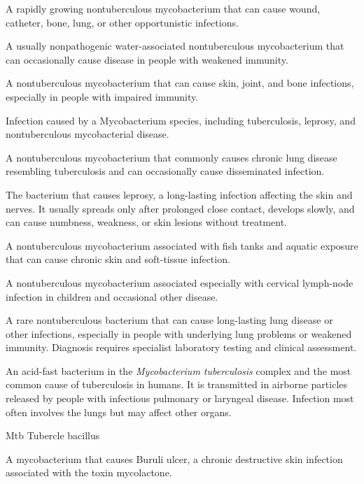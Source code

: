  A rapidly growing nontuberculous mycobacterium that can cause wound, catheter, bone, lung, or other opportunistic infections.

 A usually nonpathogenic water-associated nontuberculous mycobacterium that can occasionally cause disease in people with weakened immunity.

 A nontuberculous mycobacterium that can cause skin, joint, and bone infections, especially in people with impaired immunity.

 Infection caused by a Mycobacterium species, including tuberculosis, leprosy, and nontuberculous mycobacterial disease.

 A nontuberculous mycobacterium that commonly causes chronic lung disease resembling tuberculosis and can occasionally cause disseminated infection.

 The bacterium that causes leprosy, a long-lasting infection affecting the skin and nerves. It usually spreads only after prolonged close contact, develops slowly, and can cause numbness, weakness, or skin lesions without treatment.

 A nontuberculous mycobacterium associated with fish tanks and aquatic exposure that can cause
chronic skin and soft-tissue infection.

 A nontuberculous mycobacterium associated especially with cervical lymph-node infection in children and occasional other disease.

 A rare nontuberculous bacterium that can cause long-lasting lung disease or other infections, especially in people with underlying lung problems or weakened immunity. Diagnosis requires specialist laboratory testing and clinical assessment.

 An acid-fast bacterium in the \textit{Mycobacterium tuberculosis} complex and the most common cause of tuberculosis in humans. It is transmitted in airborne particles released by people with infectious pulmonary or laryngeal disease. Infection most often involves the lungs but may affect other organs.

\synonyms
Mtb
Tubercle bacillus

 A mycobacterium that causes Buruli ulcer, a chronic destructive skin infection associated with the toxin mycolactone.

